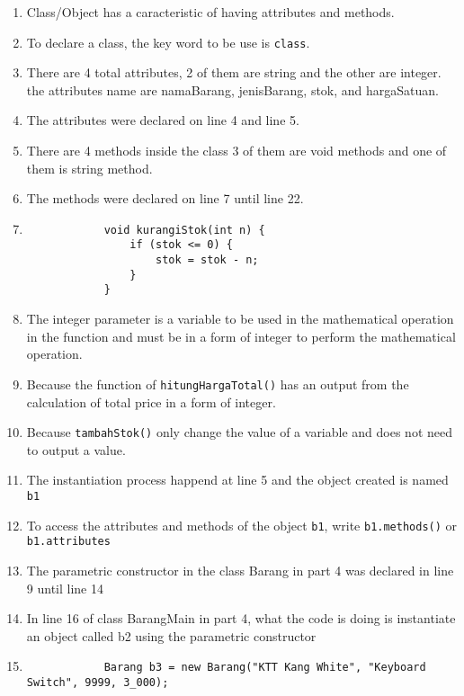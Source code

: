 \documentclass[12pt,titlepage]{article}
\begin{document}
\begin{enumerate}
    \item {
        Class/Object has a caracteristic of having attributes and methods.
    }
    \item {
        To declare a class, the key word to be use is \texttt{class}.
    }
    \item {
        There are 4 total attributes, 2 of them are string and the other are integer. the attributes name are namaBarang, jenisBarang, stok, and hargaSatuan.
    }
    \item {
        The attributes were declared on line 4 and line 5.
    }
    \item {
        There are 4 methods inside the class 3 of them are void methods and one of them is string method.
    }
    \item {
        The methods were declared on line 7 until line 22.
    }
    \item 
    {
        \begin{verbatim}
            void kurangiStok(int n) {
                if (stok <= 0) {
                    stok = stok - n;
                }
            }
        \end{verbatim}
    }
    \item {
        The integer parameter is a variable to be used in the mathematical operation in the function and must be in a form of integer to perform the mathematical operation.
    }
    \item {
        Because the function of \texttt{hitungHargaTotal()} has an output from the calculation of total price in a form of integer.
    }
    \item {
        Because \texttt{tambahStok()} only change the value of a variable and does not need to output a value.
    }
    \item {
        The instantiation process happend at line 5 and the object created is named \texttt{b1}
    }
    \item {
        To access the attributes and methods of the object \texttt{b1}, write \texttt{b1.methods()} or \texttt{b1.attributes}
    }
    \item {
        The parametric constructor in the class Barang in part 4 was declared in line 9 until line 14
    }
    \item {
        In line 16 of class BarangMain in part 4, what the code is doing is instantiate an object called b2 using the parametric constructor
    }
    \item {
        \begin{verbatim}
            Barang b3 = new Barang("KTT Kang White", "Keyboard Switch", 9999, 3_000);
        \end{verbatim}
    }
\end{enumerate}
\end{document}
